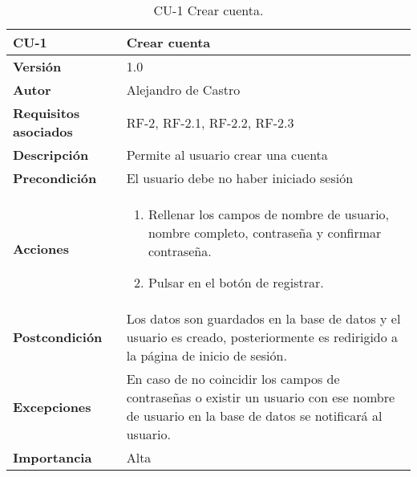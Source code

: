 \begin{table}[p]
	\centering
	\begin{tabularx}{\linewidth}{ p{} p{} }
		\toprule
		\textbf{CU-1}    & \textbf{Crear cuenta}\\
		\toprule
		\textbf{Versión}              & 1.0    \\
		\textbf{Autor}                & {Alejandro de Castro} \\
		\textbf{Requisitos asociados} & RF-2, RF-2.1, RF-2.2, RF-2.3 \\
		\textbf{Descripción}          & Permite al usuario crear una cuenta \\
		\textbf{Precondición}         & El usuario debe no haber iniciado sesión \\
		\textbf{Acciones}             &
		\begin{enumerate}
			\def\labelenumi{\arabic{enumi}.}
			\tightlist
			\item Rellenar los  campos de nombre de usuario, nombre completo, contraseña y confirmar contraseña.
			\item Pulsar en el botón de registrar.
		\end{enumerate}\\
		\textbf{Postcondición}        & Los datos son guardados en la base de datos y el usuario es creado, posteriormente es redirigido a la página de inicio de sesión. \\
		\textbf{Excepciones}          & En caso de no coincidir los campos de contraseñas o existir un usuario con ese nombre de usuario en la base de datos se notificará al usuario. \\
		\textbf{Importancia}          & Alta \\
		\bottomrule
	\end{tabularx}
	\caption{CU-1 Crear cuenta.}
\end{table}

